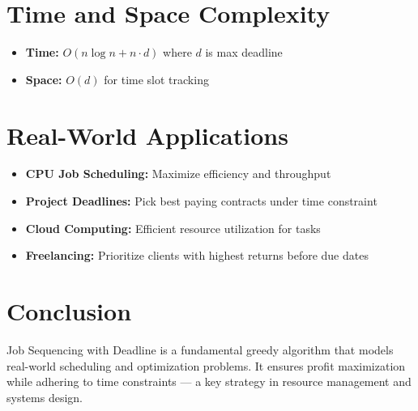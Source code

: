 \documentclass[14pt]{extarticle}
\begin{document}
\section{Time and Space Complexity}
\begin{itemize}
    \item \textbf{Time:} $O(n \log n + n \cdot d)$ where $d$ is max deadline
    \item \textbf{Space:} $O(d)$ for time slot tracking
\end{itemize}

\section{Real-World Applications}
\begin{itemize}
    \item \textbf{CPU Job Scheduling:} Maximize efficiency and throughput
    \item \textbf{Project Deadlines:} Pick best paying contracts under time constraint
    \item \textbf{Cloud Computing:} Efficient resource utilization for tasks
    \item \textbf{Freelancing:} Prioritize clients with highest returns before due dates
\end{itemize}

\section{Conclusion}
Job Sequencing with Deadline is a fundamental greedy algorithm that models real-world scheduling and optimization problems. It ensures profit maximization while adhering to time constraints — a key strategy in resource management and systems design.
\end{document}
